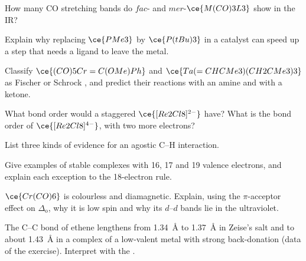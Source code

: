 \begin{exercise}[$\star\star$]\label{exo:b3:organometallic-bonding:5}
How many CO stretching bands do $fac$- and $mer$-$\ce{M(CO)3L3}$ show in the IR?
\end{exercise}

\begin{exercise}[$\star\star$]\label{exo:b3:organometallic-bonding:6}
Explain why replacing $\ce{PMe3}$ by $\ce{P(tBu)3}$ in a catalyst can speed up a step that needs a
ligand to leave the metal.
\end{exercise}

\begin{exercise}[$\star\star$]\label{exo:b3:organometallic-bonding:7}
Classify $\ce{(CO)5Cr=C(OMe)Ph}$ and $\ce{Ta(=CHCMe3)(CH2CMe3)3}$ as Fischer or Schrock , and predict their reactions with an amine and with a ketone.
\end{exercise}

\begin{exercise}[$\star\star$]\label{exo:b3:organometallic-bonding:8}
What bond order would a staggered $\ce{[Re2Cl8]^{2-}}$ have? What is the bond order of
$\ce{[Re2Cl8]^{4-}}$, with two more electrons?
\end{exercise}

\begin{exercise}[$\star\star$]\label{exo:b3:organometallic-bonding:9}
List three kinds of evidence for an agostic C--H interaction.
\end{exercise}

\begin{exercise}[$\star\star\star$]\label{exo:b3:organometallic-bonding:10}
Give examples of stable complexes with 16, 17 and 19 valence electrons, and explain
each exception to the 18-electron rule.
\end{exercise}

\begin{exercise}[$\star\star\star$]\label{exo:b3:organometallic-bonding:11}
$\ce{Cr(CO)6}$ is colourless and diamagnetic. Explain, using the $\pi$-acceptor effect on $\Delta_{\mathrm o}$,
why it is low spin and why its $d$--$d$ bands lie in the ultraviolet.
\end{exercise}

\begin{exercise}[$\star\star\star$]\label{exo:b3:organometallic-bonding:12}
The C--C bond of ethene lengthens from \qty{1.34}{\angstrom} to \qty{1.37}{\angstrom} in Zeise's salt and to
about \qty{1.43}{\angstrom} in a complex of a low-valent metal with strong back-donation (data of the
exercise). Interpret with the .
\end{exercise}

